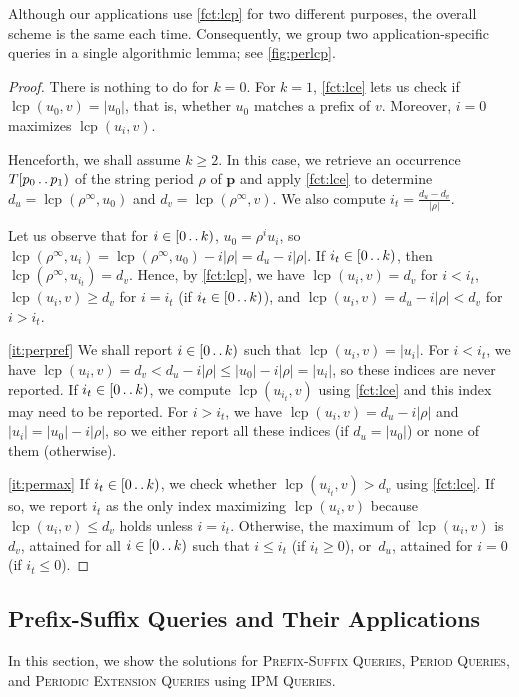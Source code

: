 \documentclass[a4paper]{article}
\theoremstyle{definition}
\theoremstyle{remark}
\newcommand{\IPM}{\textsc{IPM Queries}\xspace}
\newcommand{\PQ}{\textsc{Period Queries}\xspace}
\newcommand{\BQ}{\textsc{Prefix-Suffix Queries}\xspace}
\newcommand{\PEQ}{\textsc{Periodic Extension Queries}\xspace}
\newcommand{\lcp}{\operatorname{lcp}}
\newcommand{\lcpinf}[2]{\lcp({#1}^\infty, {#2})}
\newcommand{\dd}{\mathinner{\ldotp\ldotp}}
\begin{document}
Although our applications use \cref{fct:lcp} for two different purposes,
the overall scheme is the same each time. Consequently, we group two application-specific queries
in a single algorithmic lemma; see \cref{fig:perlcp}.

\peralg*
\begin{proof}
There is nothing to do for $k=0$.
For $k=1$, \cref{fct:lce} lets us check if $\lcp(u_0,v) = |u_0|$, that is, whether $u_0$ matches a prefix of $v$.
Moreover, $i=0$ maximizes $\lcp(u_i,v)$.

Henceforth, we shall assume $k\ge 2$. In this case, we retrieve an occurrence $T[p_0\dd p_1)$ of the string period $\rho$ of $\mathbf{p}$ and apply \cref{fct:lce} to determine $d_u = \lcpinf{\rho}{u_0}$ and $d_v = \lcpinf{\rho}{v}$.
We also compute $i_{t} = \frac{d_u-d_v}{|\rho|}$.

Let us observe that for $i \in [0 \dd k)$, $u_0 = \rho^i u_i$, so $\lcpinf{\rho}{u_i}=\lcpinf{\rho}{u_0}-i|\rho|=d_u -i|\rho|$.
If $i_t\in [0 \dd k)$, then $\lcpinf{\rho}{u_{i_t}}=d_v$.
Hence, by \cref{fct:lcp}, we have $\lcp(u_i,v)=d_v$ for $i<i_t$,
$\lcp(u_i,v)\ge d_v$ for $i=i_t$ (if $i_t \in [0 \dd k)$),
and $\lcp(u_i,v) = d_u - i|\rho|<d_v$ for $i>i_t$.

\ref{it:perpref}
We shall report $i\in [0\dd k)$ such that $\lcp(u_i,v)=|u_i|$.
For $i<i_t$, we have $\lcp(u_i,v)=d_v < d_u-i|\rho|\le |u_0|-i|\rho|=|u_i|$, so these indices are never reported.
If $i_t\in [0\dd k)$, we compute $\lcp(u_{i_t},v)$ using \cref{fct:lce} and this index may need to be reported.
For $i>i_t$, we have $\lcp(u_i,v)= d_u-i|\rho|$ and $|u_i|=|u_0|-i|\rho|$, so we either report all these indices (if $d_u=|u_0|$) or none of them (otherwise).

\ref{it:permax}
If $i_t \in [0\dd k)$, we check whether $\lcp(u_{i_t},v)>d_v$ using \cref{fct:lce}.
If so, we report $i_t$ as the only index maximizing $\lcp(u_i,v)$ because $\lcp(u_i,v)\le d_v$ holds unless $i=i_t$.
Otherwise, the maximum of $\lcp(u_i,v)$ is~$d_v$, attained for all $i\in [0\dd k)$ such that $i \le i_t$ (if $i_t \ge 0$),
or~$d_u$, attained for $i=0$ (if $i_t \le 0$).
\end{proof}


\subsection{Prefix-Suffix Queries and Their Applications}\label{sec:BQ}
In this section, we show the solutions for \BQ, \PQ, and \PEQ using \IPM.
\end{document}
